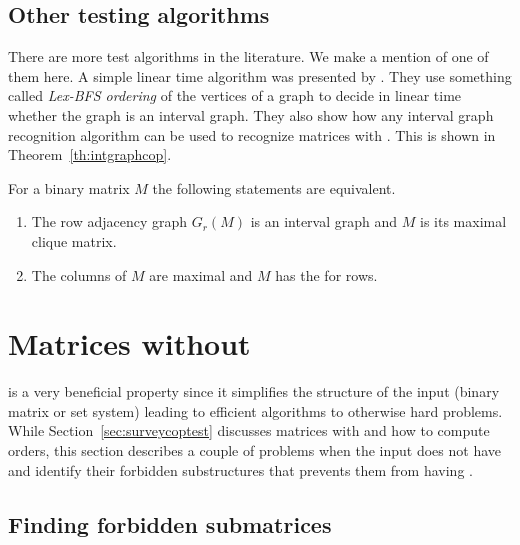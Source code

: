 \subsection{Other \COP testing algorithms}
There are more \COP test algorithms in the literature. We make a
mention of one of them here.  A simple linear time algorithm was
presented by \cite{hmpv00}. They use something called {\em Lex-BFS
  ordering} of the vertices of a graph to decide in linear time
whether the graph is an interval graph. They also show how any
interval graph recognition algorithm can be used to recognize matrices
with \COP. This is shown in Theorem~\ref{th:intgraphcop}.

\begin{theoremsansproof}
  \label{th:intgraphcop}
  For a binary matrix $M$ the following statements are equivalent.
  \begin{enumerate}
  \item The row adjacency graph $G_r(M)$ is an interval graph and $M$
    is its maximal clique matrix.
  \item The columns of $M$ are maximal and $M$ has the \COP for rows.
  \end{enumerate}
\end{theoremsansproof}


\section{Matrices without \COP}
\label{sec:surveycopopt}

\COP is a very beneficial property since it simplifies the structure
of the input (binary matrix or set system) leading to
efficient algorithms to otherwise hard problems.  While
Section~\ref{sec:surveycoptest} discusses matrices with \COP and how
to compute \COP orders, this section describes a couple of problems
when the input does not have \COP and identify their forbidden
substructures that prevents them from having \COP.

\subsection{Finding forbidden submatrices}
\label{sec:forbiddensubalgo}


